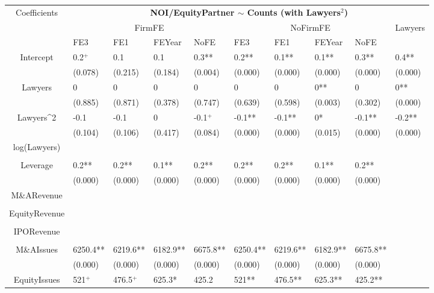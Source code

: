 \documentclass{article}
\begin{document}
\begin{table}[H]
\centering
\begin{tabular}{|clllllllll|}
\hline
\multirow{3}{*}{Coefficients} & \multicolumn{9}{c|}{\textbf{NOI/EquityPartner $\sim$ Counts (with Lawyers$^2$)}} \\
\cline{2-10}
& \multicolumn{4}{c}{FirmFE} & \multicolumn{4}{c}{NoFirmFE} & \multirow{2}{*}{Lawyers} \\
\cline{2-9}
& FE3 & FE1 & FEYear & NoFE & FE3 & FE1 & FEYear & NoFE &  \\
\hline
 
Intercept & 0.2$^{+}$ & 0.1 & 0.1 & 0.3** & 0.2** & 0.1** & 0.1** & 0.3** & 0.4** \\ 
   & (0.078) & (0.215) & (0.184) & (0.004) & (0.000) & (0.000) & (0.000) & (0.000) & (0.000) \\ 
  Lawyers & 0 & 0 & 0 & 0 & 0 & 0 & 0** & 0 & 0** \\ 
   & (0.885) & (0.871) & (0.378) & (0.747) & (0.639) & (0.598) & (0.003) & (0.302) & (0.000) \\ 
  Lawyers^2 & -0.1 & -0.1 & 0 & -0.1$^{+}$ & -0.1** & -0.1** & 0* & -0.1** & -0.2** \\ 
   & (0.104) & (0.106) & (0.417) & (0.084) & (0.000) & (0.000) & (0.015) & (0.000) & (0.000) \\ 
  log(Lawyers) &  &  &  &  &  &  &  &  &  \\ 
   &  &  &  &  &  &  &  &  &  \\ 
  Leverage & 0.2** & 0.2** & 0.1** & 0.2** & 0.2** & 0.2** & 0.1** & 0.2** &  \\ 
   & (0.000) & (0.000) & (0.000) & (0.000) & (0.000) & (0.000) & (0.000) & (0.000) &  \\ 
  M\&ARevenue &  &  &  &  &  &  &  &  &  \\ 
   &  &  &  &  &  &  &  &  &  \\ 
  EquityRevenue &  &  &  &  &  &  &  &  &  \\ 
   &  &  &  &  &  &  &  &  &  \\ 
  IPORevenue &  &  &  &  &  &  &  &  &  \\ 
   &  &  &  &  &  &  &  &  &  \\ 
  M\&AIssues & 6250.4** & 6219.6** & 6182.9** & 6675.8** & 6250.4** & 6219.6** & 6182.9** & 6675.8** &  \\ 
   & (0.000) & (0.000) & (0.000) & (0.000) & (0.000) & (0.000) & (0.000) & (0.000) &  \\ 
  EquityIssues & 521$^{+}$ & 476.5$^{+}$ & 625.3* & 425.2 & 521** & 476.5** & 625.3** & 425.2** &  \\ 

\end{tabular}
\end{table}
\end{document}
